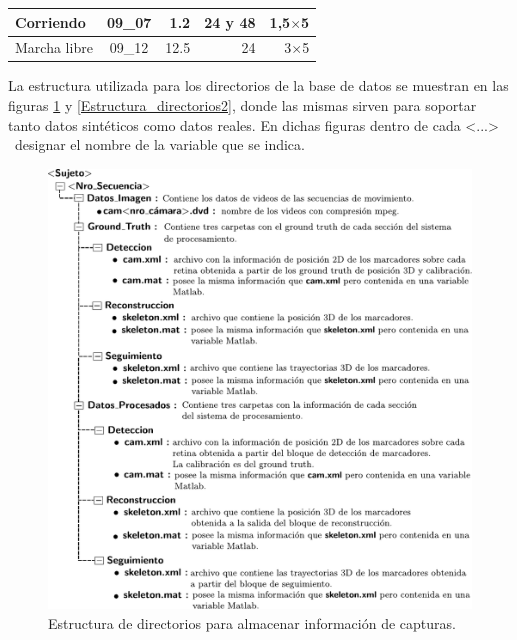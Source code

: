 \begin{table}[H]
\begin{tabular}{|l|c|r|r|r|}
Corriendo                                                                        & 09\_07                     & 1.2                                                                                    & 24 y 48                      &1,5$\times $5                                                                              \\ \hline
Marcha libre                                                                     & 09\_12                     & 12.5                                                                                   & 24                           &3$\times $5                                                                              \\ \hline
\end{tabular}
\end{table}


La estructura utilizada para los directorios de la base de datos se muestran en las figuras \ref{Estructura_directorios} y \ref{Estructura_directorios2}, donde las mismas sirven para soportar tanto datos sintéticos como datos reales. En dichas figuras dentro de cada <...>  ~designar el nombre de la variable que se indica.

\begin{figure}[ht!]
\includegraphics[scale=0.695]{img/Base_Datos/Estructura_directorios.pdf}
\caption{Estructura de directorios para almacenar información de capturas.}
\label{Estructura_directorios}
\end{figure}


